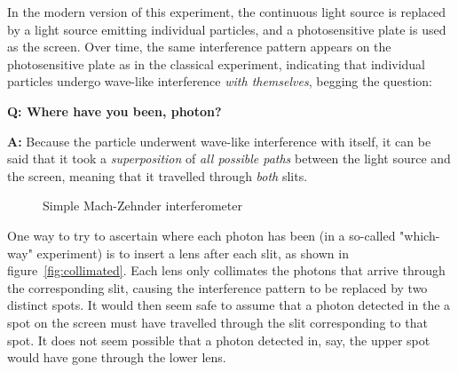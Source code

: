 \documentclass{article}
\newcommand{\Q}{\bfseries Q: }
\newcommand{\A}{\par\textbf{A:} \normalfont}
\begin{document}
In the modern version of this experiment, the continuous light source is 
replaced by a light source emitting individual particles, and a photosensitive 
plate is used as the screen. Over time, the same interference pattern appears 
on the photosensitive plate as in the classical experiment, indicating that 
individual particles undergo wave-like interference \textit{with themselves}, 
begging the question: 

\begin{framed}
\Q Where have you been, photon?  

\A Because the particle underwent wave-like interference with itself, it can be 
	said that it took a \textit{superposition} of \textit{all possible 
paths} between the light source and the screen, meaning that it travelled 
through \textit{both} slits.  \footnotemark \end{framed}


\begin{figure}[h]
	\centering
	
	\caption{Simple Mach-Zehnder interferometer}
	\label{fig:interferometer1}
\end{figure}

One way to try to ascertain where each photon has been (in a so-called 
"which-way" experiment) is to insert a lens after each slit, as shown in 
figure~\ref{fig:collimated}.  Each lens only collimates the photons that arrive 
through the corresponding slit, causing the interference pattern to be replaced 
by two distinct spots. It would then seem safe to assume that a photon detected 
in the a spot on the screen must have travelled through the slit corresponding 
to that spot. It does not seem possible that a photon detected in, say, the 
upper spot would have gone through the lower lens. 
\end{document}
